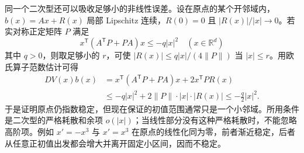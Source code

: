 同一个二次型还可以吸收足够小的非线性误差。设在原点的某个开邻域内，\(b(x)=Ax+R(x)\) 局部 Lipschitz 连续，\(R(0)=0\) 且 \(|R(x)|/|x|\to0\)。若实对称正定矩阵 \(P\) 满足
\[
 x^{\mathsf T}(A^{\mathsf T}P+PA)x\leq-q|x|^2
 \quad(x\in\mathbb R^d)
\]
其中 \(q>0\)，则取足够小的 \(r\)，可使 \(|R(x)|\leq q|x|/(4\|P\|)\) 当 \(|x|\leq r\)。用欧氏算子范数估计可得
\[
 \begin{aligned}
 DV(x)b(x)
 &=x^{\mathsf T}(A^{\mathsf T}P+PA)x+2x^{\mathsf T}PR(x)\\
 &\leq-q|x|^2+2\|P\|\cdot|x|\cdot|R(x)|
 \leq-\tfrac q2|x|^2.
 \end{aligned}
\]
于是证明原点仍指数稳定，但现在保证的初值范围通常只是一个小邻域。所用条件是二次型的严格耗散和余项 \(o(|x|)\)；当线性部分没有这种严格耗散时，不能忽略高阶项。例如 \(x'=-x^3\) 与 \(x'=x^3\) 在原点的线性化同为零，前者渐近稳定，后者从任意正初值出发都会增大并离开固定小区间，因而不稳定。
